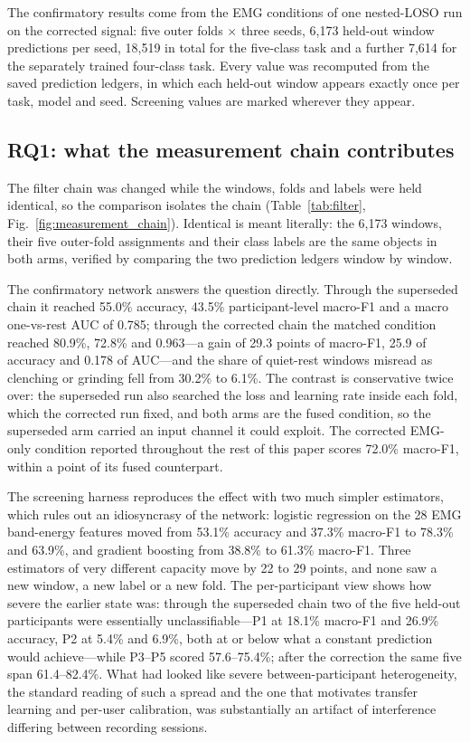 \documentclass[pdflatex,sn-nature,iicol]{sn-jnl}
\begin{document}
The confirmatory results come from the EMG conditions of one nested-LOSO run on the corrected signal: five outer folds $\times$ three seeds, 6,173 held-out window predictions per seed, 18,519 in total for the five-class task and a further 7,614 for the separately trained four-class task. Every value was recomputed from the saved prediction ledgers, in which each held-out window appears exactly once per task, model and seed. Screening values are marked wherever they appear.

\subsection{RQ1: what the measurement chain contributes}
\label{sec:rq1}

The filter chain was changed while the windows, folds and labels were held identical, so the comparison isolates the chain (Table~\ref{tab:filter}, Fig.~\ref{fig:measurement_chain}). Identical is meant literally: the 6,173 windows, their five outer-fold assignments and their class labels are the same objects in both arms, verified by comparing the two prediction ledgers window by window.

The confirmatory network answers the question directly. Through the superseded chain it reached 55.0\% accuracy, 43.5\% participant-level macro-F1 and a macro one-vs-rest AUC of 0.785; through the corrected chain the matched condition reached 80.9\%, 72.8\% and 0.963---a gain of 29.3 points of macro-F1, 25.9 of accuracy and 0.178 of AUC---and the share of quiet-rest windows misread as clenching or grinding fell from 30.2\% to 6.1\%. The contrast is conservative twice over: the superseded run also searched the loss and learning rate inside each fold, which the corrected run fixed, and both arms are the fused condition, so the superseded arm carried an input channel it could exploit. The corrected EMG-only condition reported throughout the rest of this paper scores 72.0\% macro-F1, within a point of its fused counterpart.

The screening harness reproduces the effect with two much simpler estimators, which rules out an idiosyncrasy of the network: logistic regression on the 28 EMG band-energy features moved from 53.1\% accuracy and 37.3\% macro-F1 to 78.3\% and 63.9\%, and gradient boosting from 38.8\% to 61.3\% macro-F1. Three estimators of very different capacity move by 22 to 29 points, and none saw a new window, a new label or a new fold. The per-participant view shows how severe the earlier state was: through the superseded chain two of the five held-out participants were essentially unclassifiable---P1 at 18.1\% macro-F1 and 26.9\% accuracy, P2 at 5.4\% and 6.9\%, both at or below what a constant prediction would achieve---while P3--P5 scored 57.6--75.4\%; after the correction the same five span 61.4--82.4\%. What had looked like severe between-participant heterogeneity, the standard reading of such a spread and the one that motivates transfer learning and per-user calibration, was substantially an artifact of interference differing between recording sessions.
\end{document}
